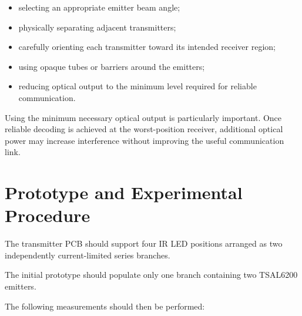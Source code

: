 \documentclass[a4paper,12pt]{article}
\begin{document}
\begin{itemize}

    \item selecting an appropriate emitter beam angle;

    \item physically separating adjacent transmitters;

    \item carefully orienting each transmitter toward its intended
    receiver region;

    \item using opaque tubes or barriers around the emitters;

    \item reducing optical output to the minimum level required for
    reliable communication.

\end{itemize}

Using the minimum necessary optical output is particularly important.
Once reliable decoding is achieved at the worst-position receiver,
additional optical power may increase interference without improving
the useful communication link.



\section{Prototype and Experimental Procedure}

The transmitter PCB should support four IR LED positions arranged as
two independently current-limited series branches.

The initial prototype should populate only one branch containing two
TSAL6200 emitters.

The following measurements should then be performed:
\end{document}
